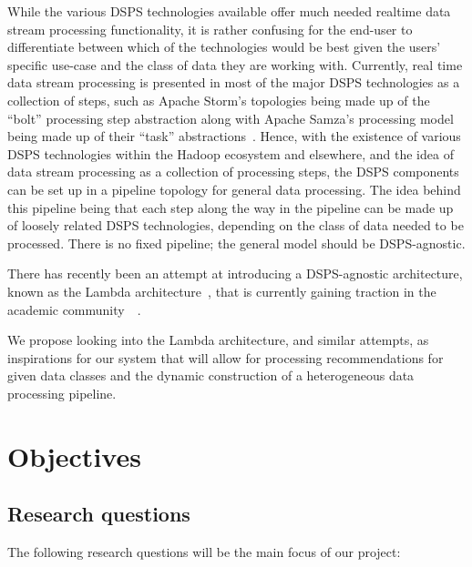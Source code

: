 \documentclass[a4paper,11pt]{article}
\begin{document}
While the various DSPS technologies available offer much needed realtime data stream processing functionality, it is
rather confusing for the end-user to differentiate between which of the technologies would be best given the users'
specific use-case and the class of data they are working with. Currently, real time data stream processing is presented
in most of the major DSPS technologies as a collection of steps, such as Apache Storm's topologies being made up of the
``bolt'' processing step abstraction along with Apache Samza's processing model being made up of their ``task''
abstractions~\cite{kamburugamuve_survey_2014}. Hence, with the existence of various DSPS technologies within the Hadoop
ecosystem and elsewhere, and the idea of data stream processing as a collection of processing steps, the DSPS components
can be set up in a pipeline topology for general data processing. The idea behind this pipeline being that each step
along the way in the pipeline can be made up of loosely related DSPS technologies, depending on the class of data needed
to be processed. There is no fixed pipeline; the general model should be DSPS-agnostic.

There has recently been an attempt at introducing a DSPS-agnostic architecture, known as the Lambda
architecture~\cite{marz2013principles}, that is currently gaining traction in the academic
community~\cite{islam_cloud_2014}~\cite{liu_survey_2014}.

We propose looking into the Lambda architecture, and similar attempts, as inspirations for our system that will allow
for processing recommendations for given data classes and the dynamic construction of a heterogeneous data processing
pipeline.





\section{Objectives} %
\label{sec:objectives}

\subsection{Research questions} %
\label{sub:research_questions}

The following research questions will be the main focus of our project:
\end{document}
